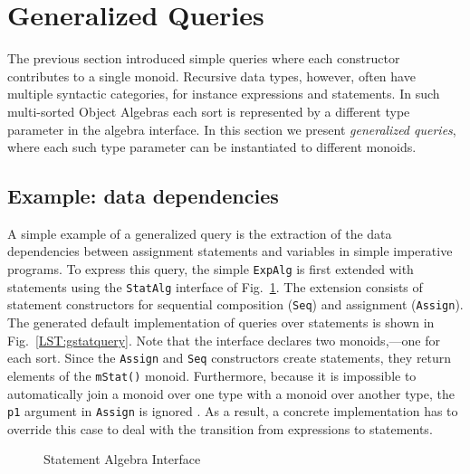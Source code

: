 \section{Generalized Queries}\label{sec:generalizedQueries}

The previous section introduced simple queries where each constructor contributes to a single monoid.
Recursive data types, however, often have multiple syntactic categories, for instance expressions and statements.
In such multi-sorted Object Algebras each sort is represented by a different type parameter in the algebra interface.
In this section we present \textit{generalized queries}, where each such type parameter can be instantiated to different monoids. 


\subsection{Example: data dependencies}
\label{subsec:depGraph}

A simple example of a generalized query is the extraction of the data dependencies between assignment statements and variables in simple imperative programs.
To express this query, the simple \lstinline{ExpAlg} is first  extended with statements using the \lstinline{StatAlg} interface of Fig.~\ref{statalg}.
The extension consists of statement constructors for sequential composition (\lstinline{Seq}) and assignment (\lstinline{Assign}).
The generated default implementation of queries over statements is shown in Fig.~\ref{LST:gstatquery}.
Note that the interface declares two monoids,---one for each sort.
Since the \lstinline{Assign} and \lstinline{Seq} constructors create statements, they return elements of the \lstinline{mStat()} monoid.
Furthermore, because it is impossible to automatically join a monoid over one type with a monoid over another type, the \lstinline{p1} argument in \lstinline{Assign} is ignored .
As a result, a concrete implementation has to override this case to deal with the transition from expressions to statements. 

\begin{figure}[t]
\vspace{-.1in}
\caption{Statement Algebra Interface}
\label{statalg}
\end{figure}


